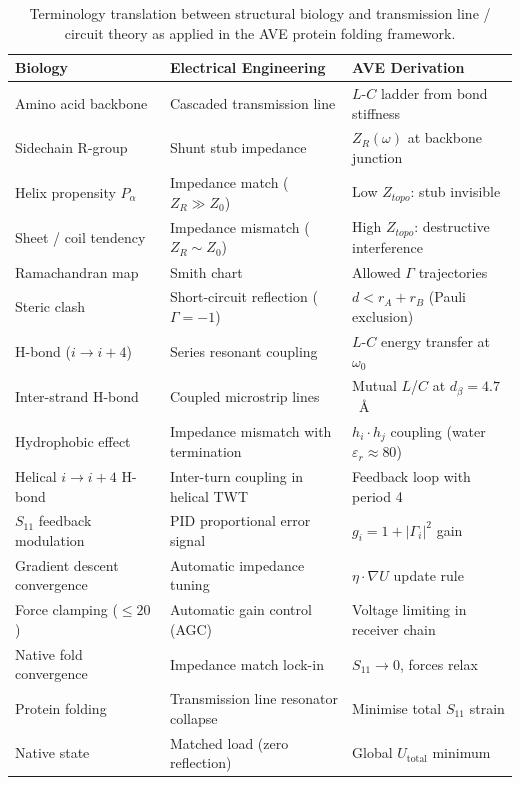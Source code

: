 \begin{table}[H]
\centering
\caption{Terminology translation between structural biology and transmission line / circuit theory as applied in the AVE protein folding framework.}
\label{tab:terminology}
\small
\begin{tabular}{@{}p{5.5cm} p{5.5cm} p{4cm}@{}}
\toprule
\textbf{Biology} & \textbf{Electrical Engineering} & \textbf{AVE Derivation} \\
\midrule
Amino acid backbone & Cascaded transmission line & $L$-$C$ ladder from bond stiffness \\
Sidechain R-group & Shunt stub impedance & $Z_R(\omega)$ at backbone junction \\
Helix propensity $P_\alpha$ & Impedance match ($Z_R \gg Z_0$) & Low $Z_{topo}$: stub invisible \\
Sheet / coil tendency & Impedance mismatch ($Z_R \sim Z_0$) & High $Z_{topo}$: destructive interference \\
Ramachandran map & Smith chart & Allowed $\Gamma$ trajectories \\
Steric clash & Short-circuit reflection ($\Gamma = -1$) & $d < r_A + r_B$ (Pauli exclusion) \\
H-bond ($i \to i{+}4$) & Series resonant coupling & $L$-$C$ energy transfer at $\omega_0$ \\
Inter-strand H-bond & Coupled microstrip lines & Mutual $L$/$C$ at $d_\beta = 4.7$~\AA \\
Hydrophobic effect & Impedance mismatch with termination & $h_i \cdot h_j$ coupling (water $\varepsilon_r \approx 80$) \\
Helical $i \to i{+}4$ H-bond & Inter-turn coupling in helical TWT & Feedback loop with period 4 \\
$S_{11}$ feedback modulation & PID proportional error signal & $g_i = 1 + |\Gamma_i|^2$ gain \\
Gradient descent convergence & Automatic impedance tuning & $\eta \cdot \nabla U$ update rule \\
Force clamping ($\leq 20$) & Automatic gain control (AGC) & Voltage limiting in receiver chain \\
Native fold convergence & Impedance match lock-in & $S_{11} \to 0$, forces relax \\
Protein folding & Transmission line resonator collapse & Minimise total $S_{11}$ strain \\
Native state & Matched load (zero reflection) & Global $U_{\text{total}}$ minimum \\

\end{tabular}
\end{table}
